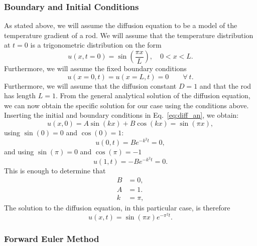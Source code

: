 \documentclass[a4paper, 
amsfonts, 
amssymb, 
amsmath, 
reprint, 
showkeys, 
nofootinbib, 
twoside]{revtex4-2}
\begin{document}
\subsubsection{Boundary and Initial Conditions}

As stated above, we will assume the diffusion equation to be a model of the temperature gradient of a rod. We will assume that the temperature distribution at $t = 0$ is a trigonometric distribution on the form
\begin{equation}
    u(x, t = 0) = \sin(\frac{\pi x}{L}), \quad 0 < x < L.
\end{equation}
Furthermore, we will assume the fixed boundary conditions
\begin{equation}
    u(x = 0, t) = u(x = L, t) = 0 \qquad \forall \ t.
\end{equation}
Furthermore, we will assume that the diffusion constant $D = 1$ and that the rod has length $L = 1$.
From the general analytical solution of the diffusion equation, we can now obtain the specific solution for our case using the conditions above. Inserting the initial and boundary conditions in Eq.~\eqref{eq:diff_an}, we obtain:
\begin{equation}
    u(x, 0) = A \sin(kx) + B \cos(kx) = \sin(\pi x),
\end{equation}
using $\sin(0) = 0$ and $\cos(0) = 1$: 
\begin{equation}
    u(0, t) = B e^{-k^2t} = 0,
\end{equation}
and using $\sin(\pi) = 0$ and $\cos(\pi ) = -1$
\begin{equation}
    u(1, t) = -B e^{-k^2t} = 0.
\end{equation}
This is enough to determine that 
\begin{align*}
    B &= 0, \\
    A &= 1. \\
    k &= \pi,
\end{align*}
The solution to the diffusion equation, in this particular case, is therefore 
\begin{equation}
    u(x, t) = \sin(\pi x) e^{-\pi^2 t}.
    \label{eq:diff_analytical}
\end{equation}

\subsubsection{Forward Euler Method}
\end{document}
